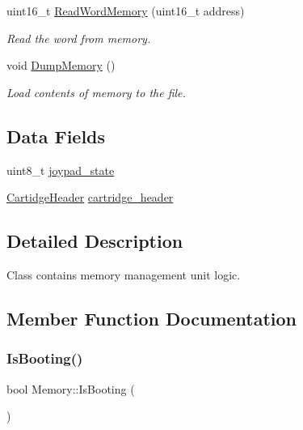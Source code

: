 \begin{DoxyCompactItemize}
uint16\+\_\+t \mbox{\hyperlink{classMemory_ad314fa06068d46d02aabd53277c24b48}{Read\+Word\+Memory}} (uint16\+\_\+t address)
\begin{DoxyCompactList}\small\item\em Read the word from memory. \end{DoxyCompactList}\item 
\mbox{\label{classMemory_a017768e957671d02872ad12ca3de3e6a}} 
void \mbox{\hyperlink{classMemory_a017768e957671d02872ad12ca3de3e6a}{Dump\+Memory}} ()
\begin{DoxyCompactList}\small\item\em Load contents of memory to the file. \end{DoxyCompactList}\end{DoxyCompactItemize}
\subsection*{Data Fields}
\begin{DoxyCompactItemize}
\item 
uint8\+\_\+t \mbox{\hyperlink{classMemory_a2f955513866ad9611418411e921ac120}{joypad\+\_\+state}}
\item 
\mbox{\hyperlink{structCartidgeHeader}{Cartidge\+Header}} \mbox{\hyperlink{classMemory_a6459c5b106a92a3f24673a3448a1bab0}{cartridge\+\_\+header}}
\end{DoxyCompactItemize}


\subsection{Detailed Description}
Class contains memory management unit logic. 

\subsection{Member Function Documentation}
\mbox{\label{classMemory_a39bd949ca21b0ecde1406c17cf7f3366}} 
\subsubsection{\texorpdfstring{Is\+Booting()}{IsBooting()}}
{\footnotesize\ttfamily bool Memory\+::\+Is\+Booting (\begin{DoxyParamCaption}{ }\end{DoxyParamCaption})}



